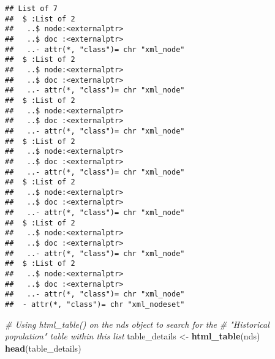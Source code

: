 \documentclass[
]{article}
\newenvironment{Shaded}{\begin{snugshade}}{\end{snugshade}}
\newcommand{\CommentTok}[1]{\textcolor[rgb]{0.56,0.35,0.01}{\textit{#1}}}
\newcommand{\FunctionTok}[1]{\textcolor[rgb]{0.13,0.29,0.53}{\textbf{#1}}}
\newcommand{\NormalTok}[1]{#1}
\newcommand{\OtherTok}[1]{\textcolor[rgb]{0.56,0.35,0.01}{#1}}
\begin{document}
\begin{verbatim}
## List of 7
##  $ :List of 2
##   ..$ node:<externalptr> 
##   ..$ doc :<externalptr> 
##   ..- attr(*, "class")= chr "xml_node"
##  $ :List of 2
##   ..$ node:<externalptr> 
##   ..$ doc :<externalptr> 
##   ..- attr(*, "class")= chr "xml_node"
##  $ :List of 2
##   ..$ node:<externalptr> 
##   ..$ doc :<externalptr> 
##   ..- attr(*, "class")= chr "xml_node"
##  $ :List of 2
##   ..$ node:<externalptr> 
##   ..$ doc :<externalptr> 
##   ..- attr(*, "class")= chr "xml_node"
##  $ :List of 2
##   ..$ node:<externalptr> 
##   ..$ doc :<externalptr> 
##   ..- attr(*, "class")= chr "xml_node"
##  $ :List of 2
##   ..$ node:<externalptr> 
##   ..$ doc :<externalptr> 
##   ..- attr(*, "class")= chr "xml_node"
##  $ :List of 2
##   ..$ node:<externalptr> 
##   ..$ doc :<externalptr> 
##   ..- attr(*, "class")= chr "xml_node"
##  - attr(*, "class")= chr "xml_nodeset"
\end{verbatim}

\begin{Shaded}
\begin{Highlighting}[]
\CommentTok{\# Using html\_table() on the nds object to search for the }
\CommentTok{\# "Historical population" table within this list }
\NormalTok{table\_details }\OtherTok{\textless{}{-}} \FunctionTok{html\_table}\NormalTok{(nds)}
\FunctionTok{head}\NormalTok{(table\_details)}
\end{Highlighting}
\end{Shaded}
\end{document}
